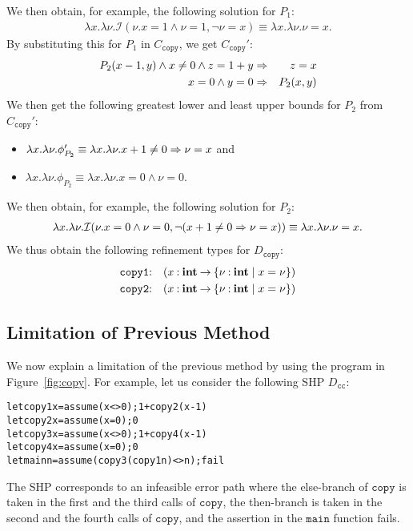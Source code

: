 We then obtain, for example, the following solution for \(P_1\):
\begin{eqnarray*}
\lambda x.\lambda \nu.\mathcal{I}(\nu.x=1 \land \nu=1,\neg \nu=x) \equiv \lambda x.\lambda \nu.\nu=x.
\end{eqnarray*}
By substituting this for \(P_1\) in \(C_{\texttt{copy}}\), we get 
\(C_{\texttt{copy}}'\):
\begin{eqnarray*}
P_2(x-1,y) \land x\neq0 \land z=1+y &\Rightarrow& z=x \\
x=0 \land y=0 &\Rightarrow& P_2(x,y)
\end{eqnarray*}
We then get the following greatest lower and least upper bounds for 
\(P_2\) from \(C_{\texttt{copy}}'\):
\begin{itemize}
\item \(\lambda x.\lambda \nu. \phi_{P_2}' \equiv \lambda x.\lambda \nu. x+1\neq0 \Rightarrow \nu=x\) and
\item \(\lambda x.\lambda \nu. \phi_{P_2} \equiv \lambda x.\lambda \nu. x=0 \land \nu=0\).
\end{itemize}
We then obtain, for example, the following solution for \(P_2\):
\begin{eqnarray*}
\lambda x.\lambda \nu.\mathcal{I}(\nu.x=0 \land \nu=0,\neg (x+1\neq0 \Rightarrow \nu=x)) \equiv \lambda x.\lambda \nu.\nu=x.
\end{eqnarray*}
We thus obtain the following refinement types for \(D_{\texttt{copy}}\):
\begin{eqnarray*}
\texttt{copy1}&\mathbin{:}&(x\mathbin{:}{\mathbf{int}}\mathbin{\rightarrow}{\{{\nu\mathbin{:}\mathbf{int} \mid x=\nu}\}}) \\
\texttt{copy2}&\mathbin{:}&(x\mathbin{:}{\mathbf{int}}\mathbin{\rightarrow}{\{{\nu\mathbin{:}\mathbf{int} \mid x=\nu}\}})
\end{eqnarray*}

\subsection{Limitation of Previous Method}
\label{sec:limit}

We now explain a limitation of the previous method by using the program 
in Figure~\ref{fig:copy}.  For example, let us consider the following 
SHP \(D_{\texttt{cc}}\):
\begin{alltt}
let copy1 x = assume (x<>0); 1 + copy2 (x-1)
let copy2 x = assume (x=0); 0
let copy3 x = assume (x<>0); 1 + copy4 (x-1)
let copy4 x = assume (x=0); 0
let main n = assume (copy3 (copy1 n) <> n); fail
\end{alltt}
The SHP corresponds to an infeasible error path where the else-branch of 
\(\texttt{copy}\) is taken in the first and the third calls of 
\(\texttt{copy}\), the then-branch is taken in the second and the fourth 
calls of \(\texttt{copy}\), and the assertion in the \(\texttt{main}\) 
function fails.

